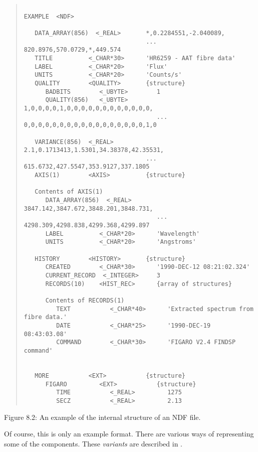 \begin{quote}

\begin{small}
\begin{verbatim}

EXAMPLE  <NDF>

   DATA_ARRAY(856)  <_REAL>       *,0.2284551,-2.040089,
                                  ... 820.8976,570.0729,*,449.574
   TITLE          <_CHAR*30>      'HR6259 - AAT fibre data'
   LABEL          <_CHAR*20>      'Flux'
   UNITS          <_CHAR*20>      'Counts/s'
   QUALITY        <QUALITY>       {structure}
      BADBITS        <_UBYTE>        1
      QUALITY(856)   <_UBYTE>        1,0,0,0,0,1,0,0,0,0,0,0,0,0,0,0,0,0,
                                     ... 0,0,0,0,0,0,0,0,0,0,0,0,0,0,0,0,0,1,0

   VARIANCE(856)  <_REAL>         2.1,0.1713413,1.5301,34.38378,42.35531,
                                  ... 615.6732,427.5547,353.9127,337.1805
   AXIS(1)        <AXIS>          {structure}

   Contents of AXIS(1)
      DATA_ARRAY(856)  <_REAL>       3847.142,3847.672,3848.201,3848.731,
                                     ... 4298.309,4298.838,4299.368,4299.897
      LABEL          <_CHAR*20>      'Wavelength'
      UNITS          <_CHAR*20>      'Angstroms'

   HISTORY        <HISTORY>       {structure}
      CREATED        <_CHAR*30>      '1990-DEC-12 08:21:02.324'
      CURRENT_RECORD  <_INTEGER>     3
      RECORDS(10)    <HIST_REC>      {array of structures}

      Contents of RECORDS(1)
         TEXT           <_CHAR*40>      'Extracted spectrum from fibre data.'
         DATE           <_CHAR*25>      '1990-DEC-19 08:43:03.08'
         COMMAND        <_CHAR*30>      'FIGARO V2.4 FINDSP command'


   MORE           <EXT>           {structure}
      FIGARO         <EXT>           {structure}
         TIME           <_REAL>         1275
         SECZ           <_REAL>         2.13
\end{verbatim}
\end{small}

\end{quote}
\begin{center}
Figure 8.2: An example of the internal structure of an NDF file.
\end{center}
Of course, this is only an example format.
There are various ways of representing some of the components. 
These {\sl variants\/} are described in .

